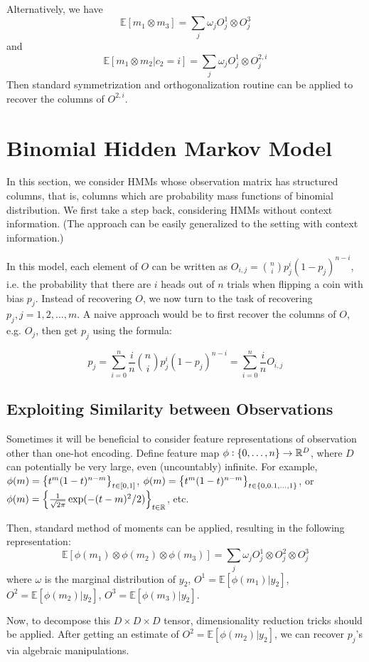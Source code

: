 \documentclass{article}
\def\E{\mathbb{E}}
\def\R{\mathbb{R}}
\begin{document}
Alternatively, we have
\[ \E [m_1 \otimes m_3] = \sum_j \omega_j O^1_j \otimes O^3_j \]
and
\[ \E [m_1 \otimes m_2 | c_2 = i] = \sum_j \omega_j O^{1}_j \otimes O^{2, i}_j \]
Then standard symmetrization and orthogonalization routine can be applied to recover the columns of $O^{2, i}$.

\section{Binomial Hidden Markov Model}
In this section, we consider HMMs whose observation matrix has structured columns, that is, columns which are probability mass functions of binomial distribution. We first take a step back, considering HMMs without context information. (The approach can be easily generalized to the setting with context information.)

In this model, each element of $O$ can be written as $O_{i,j} = {n \choose i} p_j^i (1-p_j)^{n-i}$, i.e. the probability that there are $i$ heads out of $n$ trials when flipping a coin with bias $p_j$. Instead of recovering $O$, we now turn to the task of recovering $p_j, j = 1,2,\ldots,m$. A naive approach would be to first recover the columns of $O$, e.g. $O_j$, then get $p_j$ using the formula:

\[ p_j = \sum_{i=0}^n \frac{i}{n} {n \choose i} p_j^i (1-p_j)^{n-i} = \sum_{i=0}^n \frac{i}{n} O_{i,j} \]

\subsection{Exploiting Similarity between Observations}
Sometimes it will be beneficial to consider feature representations of observation other than one-hot encoding. Define feature map $\phi: \cbr{0,\ldots,n} \to \R^D$, where $D$ can potentially be very large, even (uncountably) infinite. For example, $\phi(m) = \cbr{t^m (1-t)^{n-m}}_{t \in [0,1]}$, $\phi(m) = \cbr{t^m (1-t)^{n-m}}_{t \in \cbr{0,0.1, \ldots, 1}}$, or $\phi(m) = \cbr{ \frac{1}{\sqrt{2\pi}} \exp(-(t-m)^2/2)}_{t \in \R}$, etc.

Then, standard method of moments can be applied, resulting in the following representation:
\[ \E [\phi(m_1) \otimes \phi(m_2) \otimes \phi(m_3)] = \sum_j \omega_j O^{1}_j \otimes O^{2}_j \otimes O^{3}_j \]
where $\omega$ is the marginal distribution of $y_2$, $O^{1} = \E[\phi(m_1) | y_2]$, $O^{2} = \E[\phi(m_2) | y_2]$, $O^{3} = \E[\phi(m_3) | y_2]$.

Now, to decompose this $D \times D \times D$ tensor, dimensionality reduction tricks should be applied. After getting an estimate of $O^{2} = \E[\phi(m_2) | y_2]$, we can recover $p_j$'s via algebraic manipulations.
\end{document}
